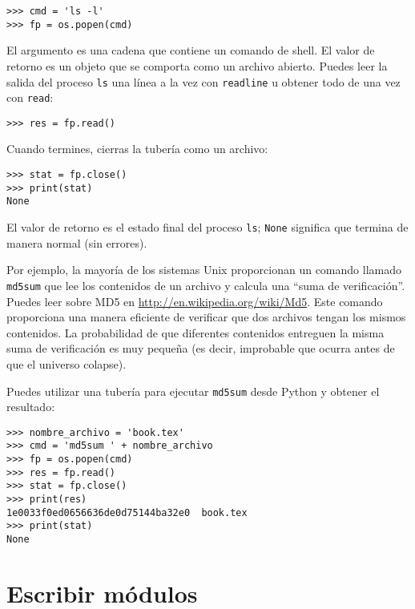 \documentclass[10pt]{book}
\begin{document}
\begin{verbatim}
>>> cmd = 'ls -l'
>>> fp = os.popen(cmd)
\end{verbatim}
%
El argumento es una cadena que contiene un comando de shell.  El
valor de retorno es un objeto que se comporta como un archivo
abierto.  Puedes leer la salida del proceso {\tt ls} una
línea a la vez con {\tt readline} u obtener todo de una vez
con {\tt read}:

\begin{verbatim}
>>> res = fp.read()
\end{verbatim}
%
Cuando termines, cierras la tubería como un archivo:

\begin{verbatim}
>>> stat = fp.close()
>>> print(stat)
None
\end{verbatim}
%
El valor de retorno es el estado final del proceso {\tt ls};
{\tt None} significa que termina de manera normal (sin errores).

Por ejemplo, la mayoría de los sistemas Unix proporcionan un comando llamado {\tt md5sum}
que lee los contenidos de un archivo y calcula una ``suma de verificación''.
Puedes leer sobre MD5 en \url{http://en.wikipedia.org/wiki/Md5}.  Este
comando proporciona una manera eficiente de verificar que dos archivos
tengan los mismos contenidos.  La probabilidad de que diferentes contenidos
entreguen la misma suma de verificación es muy pequeña (es decir, improbable que ocurra
antes de que el universo colapse).

Puedes utilizar una tubería para ejecutar {\tt md5sum} desde Python y obtener el resultado:

\begin{verbatim}
>>> nombre_archivo = 'book.tex'
>>> cmd = 'md5sum ' + nombre_archivo
>>> fp = os.popen(cmd)
>>> res = fp.read()
>>> stat = fp.close()
>>> print(res)
1e0033f0ed0656636de0d75144ba32e0  book.tex
>>> print(stat)
None
\end{verbatim}



\section{Escribir módulos}
\label{modules}
\end{document}
